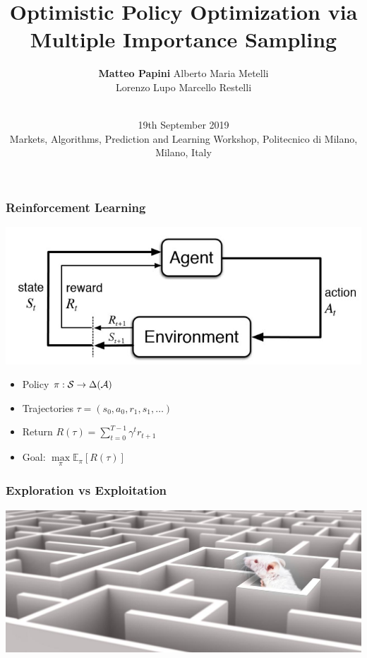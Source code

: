 \documentclass[aspectratio=169, table]{beamer}
\title{Optimistic Policy Optimization via Multiple Importance Sampling}
\date[AAA]{\vspace{0.2cm} \\ \small{ 19th September 2019 \\ Markets, Algorithms, Prediction and Learning Workshop, Politecnico di Milano, Milano, Italy}}
\author[M. Papini]{\textbf{Matteo Papini} \quad Alberto Maria Metelli\\
						{Lorenzo Lupo \quad Marcello Restelli}}
\begin{document}

\begin{frame}[noframenumbering]
\titlepage
\end{frame}

\begin{frame}
\frametitle{Reinforcement Learning~\citep{sutton2018reinforcement}} 
\begin{center}
	\includegraphics[width=.65\linewidth]{rl.jpg}
\end{center}
		\begin{itemize}
			\setlength{\itemsep}{8pt}
			\item<2-> Policy $\pi:\mathcal{S}\to\Delta(\mathcal{A})$
			\item<3-> Trajectories $\tau = (s_0, a_0, r_1, s_1,\dots)$
			\item<4-> Return $R(\tau) = \sum_{t=0}^{T-1}\gamma^t r_{t+1}$
			\item<5-> Goal: $\max\limits_{\pi} \mathbb{E}_{\pi}\left[R(\tau)\right]$
		\end{itemize}
\end{frame}

\begin{frame}
\frametitle{Exploration vs Exploitation}
\centering
\includegraphics[width=\textwidth]{mouse.jpg}
\end{frame}
\end{document}

